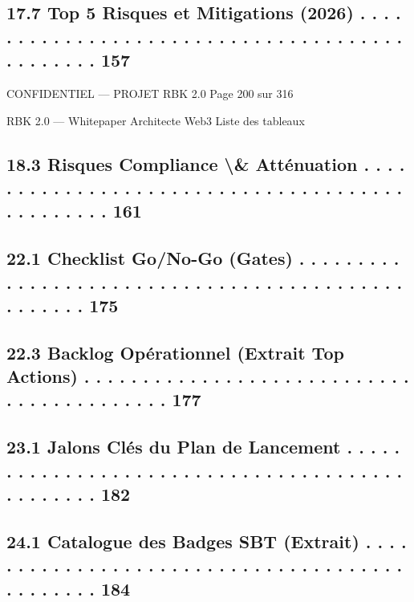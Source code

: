 \documentclass[12pt,landscape,a4paper]{article}
\newenvironment{confidential}
{\begin{tcolorbox}[
    colback=rbkred!5!white,
    colframe=rbkred!75!black,
    title=CONFIDENTIEL,
    fonttitle=\bfseries\color{white},
    coltitle=rbkred!75!black,
    breakable,
    enhanced,
    frame hidden,
    borderline west={2pt}{0pt}{rbkred!75!black}
]}
{\end{tcolorbox}}
\begin{document}
\subsection{17.7 Top 5 Risques et Mitigations (2026) . . . . . . . . . . . . . . . . . . . . . . . . . . . . . . . . . . . . . . . . . . . . . . 157}
\vspace{0.5em}
\vspace{0.5em}
\vspace{0.5em}
\begin{confidential}CONFIDENTIEL — PROJET RBK 2.0                                   Page 200 sur 316\end{confidential}
RBK 2.0 — Whitepaper Architecte Web3                                                                                         Liste des tableaux\\
\vspace{0.5em}
\vspace{0.5em}
\subsection{18.3 Risques Compliance \textbackslash{}& Atténuation . . . . . . . . . . . . . . . . . . . . . . . . . . . . . . . . . . . . . . . . . . . . . . . 161}
\vspace{0.5em}
\subsection{22.1 Checklist Go/No-Go (Gates) . . . . . . . . . . . . . . . . . . . . . . . . . . . . . . . . . . . . . . . . . . . . . . . . . . 175}
\subsection{22.3 Backlog Opérationnel (Extrait Top Actions) . . . . . . . . . . . . . . . . . . . . . . . . . . . . . . . . . . . . . . . . . . 177}
\vspace{0.5em}
\subsection{23.1 Jalons Clés du Plan de Lancement . . . . . . . . . . . . . . . . . . . . . . . . . . . . . . . . . . . . . . . . . . . . . . . 182}
\vspace{0.5em}
\subsection{24.1 Catalogue des Badges SBT (Extrait) . . . . . . . . . . . . . . . . . . . . . . . . . . . . . . . . . . . . . . . . . . . . . . 184}
\end{document}
